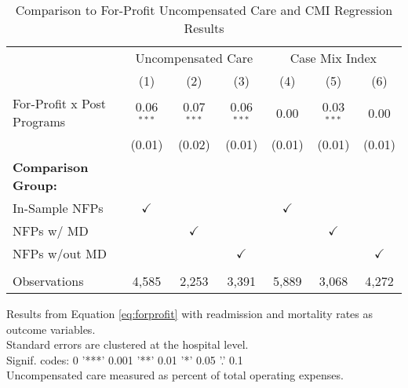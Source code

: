 \begin{table}[ht!]
   \caption{\label{tab:forprofit_uncomp_CMI_fullsample} Comparison to For-Profit Uncompensated Care and CMI Regression Results}
   \bigskip
   \centering
   \begin{tabular}{lcccccc}
      \toprule
       & \multicolumn{3}{c}{Uncompensated Care} & \multicolumn{3}{c}{Case Mix Index}\\
                                  & (1)           & (2)           & (3)           & (4)           & (5)           & (6)\\  
      \midrule 
      For-Profit x Post Programs  & 0.06$^{***}$  & 0.07$^{***}$  & 0.06$^{***}$  & 0.00          & 0.03$^{***}$  & 0.00\\   
                                  & (0.01)        & (0.02)        & (0.01)        & (0.01)        & (0.01)        & (0.01)\\   
      \textbf{Comparison Group:}  &               &               &               &               &               & \\  
      In-Sample NFPs              & $\checkmark$  &               &               & $\checkmark$  &               & \\  
      NFPs w/ MD                  &               & $\checkmark$  &               &               & $\checkmark$  & \\  
      NFPs w/out MD               &               &               & $\checkmark$  &               &               & $\checkmark$\\   
       \\
      Observations                & 4,585         & 2,253         & 3,391         & 5,889         & 3,068         & 4,272\\  
      \bottomrule
   \end{tabular}
   
   \par \raggedright 
   Results from Equation \ref{eq:forprofit} with readmission and mortality rates as outcome variables.\\
   Standard errors are clustered at the hospital level.\\
   Signif. codes: 0 '***' 0.001 '**' 0.01 '*' 0.05 '.' 0.1\\
   Uncompensated care measured as percent of total operating expenses.
\end{table}
